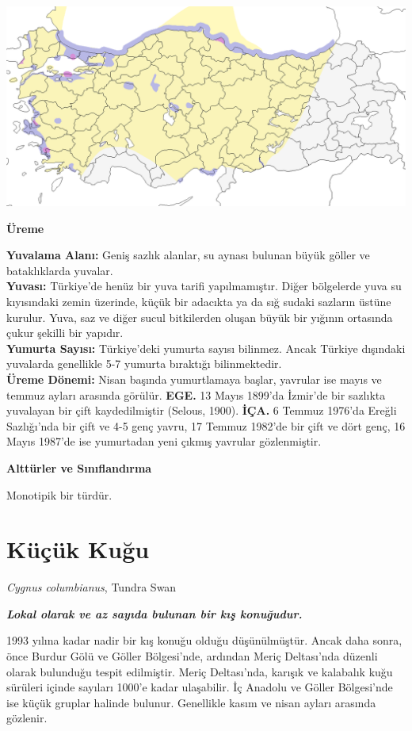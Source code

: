 \documentclass[
  a4paper,
  DIV=11,
  numbers=noendperiod]{scrartcl}
\begin{document}
\includegraphics{images/harita_Cygnus olor.png}

\textbf{Üreme}

\textbf{Yuvalama Alanı:} Geniş sazlık alanlar, su aynası bulunan büyük
göller ve bataklıklarda yuvalar.\\
\textbf{Yuvası:} Türkiye'de henüz bir yuva tarifi yapılmamıştır. Diğer
bölgelerde yuva su kıyısındaki zemin üzerinde, küçük bir adacıkta ya da
sığ sudaki sazların üstüne kurulur. Yuva, saz ve diğer sucul bitkilerden
oluşan büyük bir yığının ortasında çukur şekilli bir yapıdır.\\
\textbf{Yumurta Sayısı:} Türkiye'deki yumurta sayısı bilinmez. Ancak
Türkiye dışındaki yuvalarda genellikle 5-7 yumurta bıraktığı
bilinmektedir.\\
\textbf{Üreme Dönemi:} Nisan başında yumurtlamaya başlar, yavrular ise
mayıs ve temmuz ayları arasında görülür. \textbf{EGE.} 13 Mayıs 1899'da
İzmir'de bir sazlıkta yuvalayan bir çift kaydedilmiştir (Selous, 1900).
\textbf{İÇA.} 6 Temmuz 1976'da Ereğli Sazlığı'nda bir çift ve 4-5 genç
yavru, 17 Temmuz 1982'de bir çift ve dört genç, 16 Mayıs 1987'de ise
yumurtadan yeni çıkmış yavrular gözlenmiştir.

\textbf{Alttürler ve Sınıflandırma}

Monotipik bir türdür.

\section{Küçük Kuğu}\label{kuxfcuxe7uxfck-kuux11fu}

\emph{Cygnus columbianus}, Tundra Swan

\textbf{\emph{Lokal olarak ve az sayıda bulunan bir kış konuğudur.}}

1993 yılına kadar nadir bir kış konuğu olduğu düşünülmüştür. Ancak daha
sonra, önce Burdur Gölü ve Göller Bölgesi'nde, ardından Meriç
Deltası'nda düzenli olarak bulunduğu tespit edilmiştir. Meriç
Deltası'nda, karışık ve kalabalık kuğu sürüleri içinde sayıları 1000'e
kadar ulaşabilir. İç Anadolu ve Göller Bölgesi'nde ise küçük gruplar
halinde bulunur. Genellikle kasım ve nisan ayları arasında gözlenir.
\end{document}
